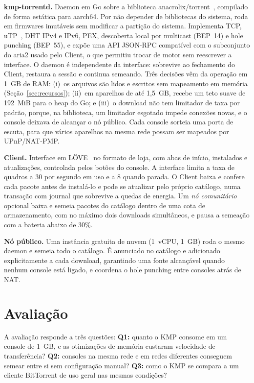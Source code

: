 \documentclass[12pt]{article}
\newcommand{\kmp}{\textsc{KMP}}
\begin{document}
\textbf{kmp-torrentd.} Daemon em Go sobre a biblioteca
anacrolix/torrent~\cite{anacrolix}, compilado de forma estática para
aarch64. Por não depender de bibliotecas do sistema, roda em firmwares
imutáveis sem modificar a partição do sistema. Implementa TCP,
uTP~\cite{bep29}, DHT IPv4 e IPv6, PEX, descoberta local por multicast
(BEP~14) e hole punching (BEP~55), e expõe uma API JSON-RPC compatível com o
subconjunto do aria2 usado pelo Client, o que permitiu trocar de motor sem
reescrever a interface. O daemon é independente da interface: sobrevive ao
fechamento do Client, restaura a sessão e continua semeando. Três decisões
vêm da operação em 1~GB de RAM:
(i)~os arquivos são lidos e escritos sem mapeamento em memória
(Seção~\ref{sec:recursos});
(ii)~em aparelhos de até 1,5~GB, recebe um teto suave de 192~MiB para o heap
do Go; e
(iii)~o download não tem limitador de taxa por padrão, porque, na biblioteca,
um limitador esgotado impede conexões novas, e o console deixava de alcançar
o nó público.
Cada console sorteia uma porta de escuta, para que vários aparelhos na mesma
rede possam ser mapeados por UPnP/NAT-PMP.

\textbf{Client.} Interface em LÖVE~\cite{love2d} no formato de loja, com
abas de início, instalados e atualizações, controlada pelos botões do
console. A interface limita a taxa de quadros a 30 por segundo em uso e a 8
quando parada. O Client baixa e confere cada pacote antes de instalá-lo e
pode se atualizar pelo próprio catálogo, numa transação com journal que
sobrevive a quedas de energia. Um \emph{nó comunitário} opcional baixa e
semeia pacotes do catálogo dentro de uma cota de armazenamento, com no máximo
dois downloads simultâneos, e pausa a semeação com a bateria abaixo de 30\%.

\textbf{Nó público.} Uma instância gratuita de nuvem (1~vCPU, 1~GB) roda o
mesmo daemon e semeia todo o catálogo. É anunciado no catálogo e adicionado
explicitamente a cada download, garantindo uma fonte alcançável quando
nenhum console está ligado, e coordena o hole punching entre consoles atrás
de NAT.

\section{Avaliação}
\label{sec:avaliacao}

A avaliação responde a três questões:
\textbf{Q1:} quanto o \kmp{} consome em um console de 1~GB, e as otimizações
de memória custaram velocidade de transferência?
\textbf{Q2:} consoles na mesma rede e em redes diferentes conseguem semear
entre si sem configuração manual?
\textbf{Q3:} como o \kmp{} se compara a um cliente BitTorrent de uso geral
nas mesmas condições?
\end{document}
